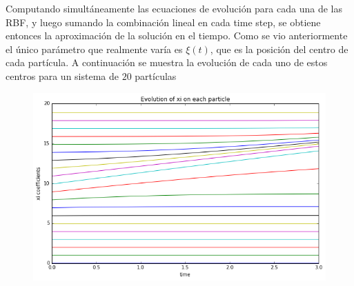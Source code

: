 ﻿\documentclass[spanish]{article}
\begin{document}
    Computando simultáneamente las ecuaciones de evolución para cada una de las RBF, y luego sumando la combinación lineal en cada time step, se obtiene entonces la aproximación de la solución en el tiempo. Como se vio anteriormente el único parámetro que realmente varía es $\xi(t)$, que es la posición del centro de cada partícula. A continuación se muestra la evolución de cada uno de estos centros para un sistema de $20$ partículas
    \begin{figure}[H]
      \centering
      \includegraphics[scale=0.5]{xis.png}
    \end{figure}
    
\end{document}
